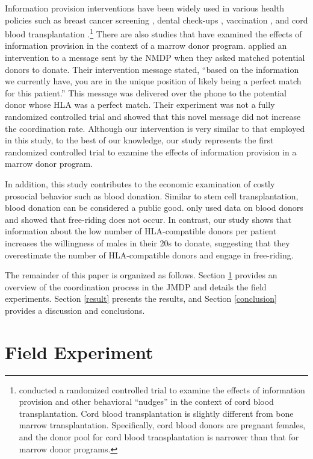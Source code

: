 \documentclass[12pt, a4paper]{article}
\begin{document}
Information provision interventions have been widely used in various health policies such as breast cancer screening \citep{Bertoni2020}, dental check-ups \citep{Altmann2014}, vaccination \citep[e.g.,][]{Dai2021, Milkman2021}, and cord blood transplantation \citep{Grieco2018}.\footnote{\citet{Grieco2018} conducted a randomized controlled trial to examine the effects of information provision and other behavioral ``nudges'' in the context of cord blood transplantation. Cord blood transplantation is slightly different from bone marrow transplantation. Specifically, cord blood donors are pregnant females, and the donor pool for cord blood transplantation is narrower than that for marrow donor programs.} There are also studies that have examined the effects of information provision in the context of a marrow donor program. \citet{Switzer2018} applied an intervention to a message sent by the NMDP when they asked matched potential donors to donate. Their intervention message stated, ``based on the information we currently have, you are in the unique position of likely being a perfect match for this patient.'' This message was delivered over the phone to the potential donor whose HLA was a perfect match. Their experiment was not a fully randomized controlled trial and showed that this novel message did not increase the coordination rate. Although our intervention is very similar to that employed in this study, to the best of our knowledge, our study represents the first randomized controlled trial to examine the effects of information provision in a marrow donor program.

In addition, this study contributes to the economic examination of costly prosocial behavior such as blood donation. Similar to stem cell transplantation, blood donation can be considered a public good. \citet{Wildman2009} only used data on blood donors and showed that free-riding does not occur. In contrast, our study shows that information about the low number of HLA-compatible donors per patient increases the willingness of males in their 20s to donate, suggesting that they overestimate the number of HLA-compatible donors and engage in free-riding.

The remainder of this paper is organized as follows. Section \ref{experiment} provides an overview of the coordination process in the JMDP and details the field experiments. Section \ref{result} presents the results, and Section \ref{conclusion} provides a discussion and conclusions.

\hypertarget{experiment}{%
\section{Field Experiment}\label{experiment}}
\end{document}

